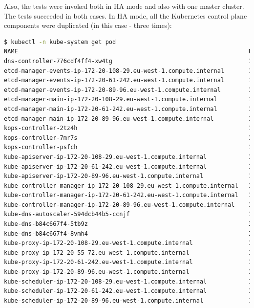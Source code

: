 Also, the tests were invoked both in HA mode and also with one master cluster. The tests succeeded in both cases. In HA mode, all the Kubernetes control plane components were duplicated (in this case - three times):
\begin{lstlisting}[basicstyle=\tiny,caption={TODO},captionpos=b,language=Bash,xleftmargin=1cm]
$ kubectl -n kube-system get pod
NAME                                                                  READY   STATUS    RESTARTS   AGE
dns-controller-776cdf4ff4-xw4tg                                       1/1     Running   0          2m18s
etcd-manager-events-ip-172-20-108-29.eu-west-1.compute.internal       1/1     Running   0          66s
etcd-manager-events-ip-172-20-61-242.eu-west-1.compute.internal       1/1     Running   0          86s
etcd-manager-events-ip-172-20-89-96.eu-west-1.compute.internal        1/1     Running   0          96s
etcd-manager-main-ip-172-20-108-29.eu-west-1.compute.internal         1/1     Running   0          53s
etcd-manager-main-ip-172-20-61-242.eu-west-1.compute.internal         1/1     Running   0          56s
etcd-manager-main-ip-172-20-89-96.eu-west-1.compute.internal          1/1     Running   0          80s
kops-controller-2tz4h                                                 1/1     Running   0          2m8s
kops-controller-7mr7s                                                 1/1     Running   0          2m14s
kops-controller-psfch                                                 1/1     Running   0          2m8s
kube-apiserver-ip-172-20-108-29.eu-west-1.compute.internal            1/1     Running   3          110s
kube-apiserver-ip-172-20-61-242.eu-west-1.compute.internal            1/1     Running   3          114s
kube-apiserver-ip-172-20-89-96.eu-west-1.compute.internal             1/1     Running   3          92s
kube-controller-manager-ip-172-20-108-29.eu-west-1.compute.internal   1/1     Running   0          2m6s
kube-controller-manager-ip-172-20-61-242.eu-west-1.compute.internal   1/1     Running   0          105s
kube-controller-manager-ip-172-20-89-96.eu-west-1.compute.internal    1/1     Running   0          79s
kube-dns-autoscaler-594dcb44b5-ccnjf                                  1/1     Running   0          2m19s
kube-dns-b84c667f4-5tb9z                                              3/3     Running   0          105s
kube-dns-b84c667f4-8vmh4                                              3/3     Running   0          2m21s
kube-proxy-ip-172-20-108-29.eu-west-1.compute.internal                1/1     Running   0          116s
kube-proxy-ip-172-20-55-72.eu-west-1.compute.internal                 1/1     Running   0          110s
kube-proxy-ip-172-20-61-242.eu-west-1.compute.internal                1/1     Running   0          65s
kube-proxy-ip-172-20-89-96.eu-west-1.compute.internal                 1/1     Running   0          61s
kube-scheduler-ip-172-20-108-29.eu-west-1.compute.internal            1/1     Running   0          2m
kube-scheduler-ip-172-20-61-242.eu-west-1.compute.internal            1/1     Running   0          2m13s
kube-scheduler-ip-172-20-89-96.eu-west-1.compute.internal             1/1     Running   0          112s
\end{lstlisting}

